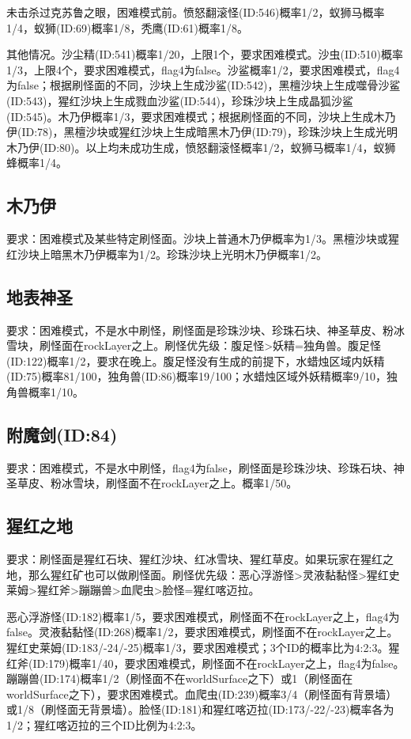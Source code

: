 未击杀过克苏鲁之眼，困难模式前。愤怒翻滚怪(ID:546)概率1/2，蚁狮马概率1/4，蚁狮(ID:69)概率1/8，秃鹰(ID:61)概率1/8。

其他情况。沙尘精(ID:541)概率1/20，上限1个，要求困难模式。沙虫(ID:510)概率1/3，上限4个，要求困难模式，flag4为false。沙鲨概率1/2，要求困难模式，flag4为false；根据刷怪面的不同，沙块上生成沙鲨(ID:542)，黑檀沙块上生成噬骨沙鲨(ID:543)，猩红沙块上生成戮血沙鲨(ID:544)，珍珠沙块上生成晶狐沙鲨(ID:545)。木乃伊概率1/3，要求困难模式；根据刷怪面的不同，沙块上生成木乃伊(ID:78)，黑檀沙块或猩红沙块上生成暗黑木乃伊(ID:79)，珍珠沙块上生成光明木乃伊(ID:80)。以上均未成功生成，愤怒翻滚怪概率1/2，蚁狮马概率1/4，蚁狮蜂概率1/4。

\subsection{木乃伊}
要求：困难模式及某些特定刷怪面。沙块上普通木乃伊概率为1/3。黑檀沙块或猩红沙块上暗黑木乃伊概率为1/2。珍珠沙块上光明木乃伊概率1/2。

\subsection{地表神圣}
要求：困难模式，不是水中刷怪，刷怪面是珍珠沙块、珍珠石块、神圣草皮、粉冰雪块，刷怪面在rockLayer之上。刷怪优先级：腹足怪>妖精=独角兽。腹足怪(ID:122)概率1/2，要求在晚上。腹足怪没有生成的前提下，水蜡烛区域内妖精(ID:75)概率81/100，独角兽(ID:86)概率19/100；水蜡烛区域外妖精概率9/10，独角兽概率1/10。

\subsection{附魔剑(ID:84)}
要求：困难模式，不是水中刷怪，flag4为false，刷怪面是珍珠沙块、珍珠石块、神圣草皮、粉冰雪块，刷怪面不在rockLayer之上。概率1/50。

\subsection{猩红之地}
要求：刷怪面是猩红石块、猩红沙块、红冰雪块、猩红草皮。如果玩家在猩红之地，那么猩红矿也可以做刷怪面。刷怪优先级：恶心浮游怪>灵液黏黏怪>猩红史莱姆>猩红斧>蹦蹦兽>血爬虫>脸怪=猩红喀迈拉。

恶心浮游怪(ID:182)概率1/5，要求困难模式，刷怪面不在rockLayer之上，flag4为false。灵液黏黏怪(ID:268)概率1/2，要求困难模式，刷怪面不在rockLayer之上。猩红史莱姆(ID:183/-24/-25)概率1/3，要求困难模式；3个ID的概率比为4:2:3。猩红斧(ID:179)概率1/40，要求困难模式，刷怪面不在rockLayer之上，flag4为false。蹦蹦兽(ID:174)概率1/2（刷怪面不在worldSurface之下）或1（刷怪面在worldSurface之下），要求困难模式。血爬虫(ID:239)概率3/4（刷怪面有背景墙）或1/8（刷怪面无背景墙）。脸怪(ID:181)和猩红喀迈拉(ID:173/-22/-23)概率各为1/2；猩红喀迈拉的三个ID比例为4:2:3。

